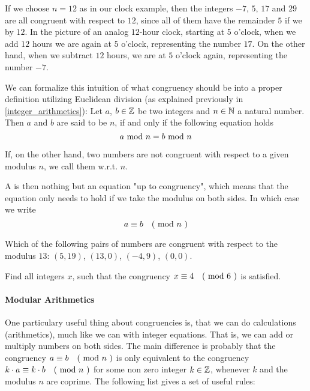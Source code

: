 \begin{example}
If we choose $n=12$ as in our clock example, then the integers $-7$, $5$, $17$ and $29$ are all congruent with respect to $12$, since all of them have the remainder $5$ if we  by $12$. In the picture of an analog $12$-hour clock, starting at $5$ o'clock, when we add $12$ hours we are again at $5$ o'clock, representing the number $17$. On the other hand, when we subtract $12$ hours, we are at $5$ o'clock again, representing the number $-7$. 
\end{example}
We can formalize this intuition of what congruency should be into a proper definition utilizing Euclidean division (as explained previously in \ref{integer_arithmetics}): Let $ a $, $ b \in \mathbb{Z} $ be two integers and $ n \in \mathbb{N} $ a natural number.
Then $ a $ and $ b $ are said to be  $ n $, if and only if the following equation holds
\begin{equation}
a \text{ mod } n = b \text{ mod } n
\end{equation}

If, on the other hand, two numbers are not congruent with respect to a given modulus $n$, we call them  w.r.t. $n$. 

A  is then nothing but an equation "up to congruency", which means that the equation only needs to hold if we take the modulus on both sides. In which case we write 
\begin{equation}
a \equiv b \quad \text{( mod } n \text{ )} 
\end{equation}
\begin{exercise}
Which of the following pairs of numbers are congruent with respect to the modulus $13$: 
$(5,19)$, $(13,0)$, $(-4,9)$, $(0,0)$.
\end{exercise}
\begin{exercise}
Find all integers $x$, such that the congruency $x \equiv 4 \quad \text{( mod } 6 \text{ )}$ is satisfied.
\end{exercise}
\paragraph{Modular Arithmetics}
One particulary useful thing about congruencies is, that we can do calculations (arithmetics), much like we can with integer equations. That is, we can add or multiply numbers on both sides. The main difference is probably that the congruency $a \equiv b \quad \text{( mod } n \text{ )}$ is only equivalent to the congruency $k\cdot a \equiv k\cdot b \quad \text{( mod } n \text{ )}$ for some non zero integer $k\in \mathbb{Z}$, whenever $k$ and the modulus $n$ are coprime. The following list gives a set of useful rules:

